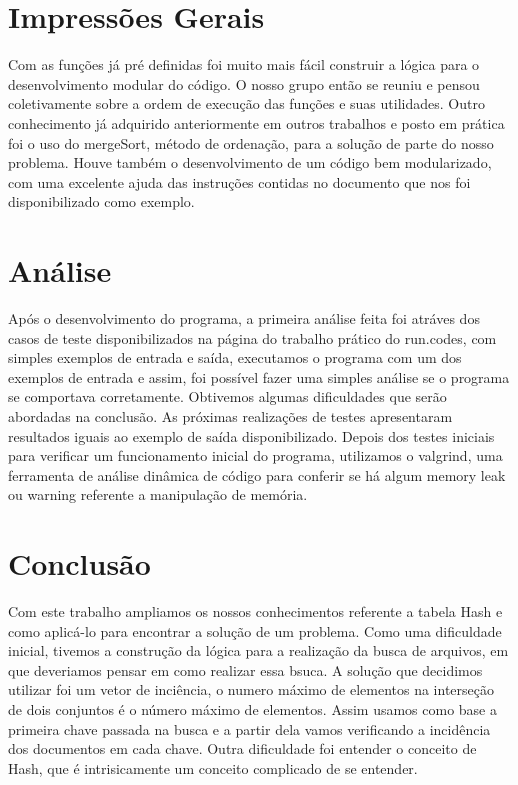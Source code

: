 \documentclass{article}
\begin{document}
\clearpage


\section{Impressões Gerais}

Com as funções já pré definidas foi muito mais fácil construir a lógica para o desenvolvimento modular do código. O nosso grupo então se reuniu e pensou coletivamente sobre a ordem de execução das funções e suas utilidades.
Outro conhecimento já adquirido anteriormente em outros trabalhos e posto em prática foi o uso do mergeSort, método de ordenação, para a solução de parte do nosso problema. Houve também o desenvolvimento de um código bem modularizado, com uma excelente ajuda das instruções contidas no documento que nos foi disponibilizado como exemplo.

\section{Análise}

Após o desenvolvimento do programa, a primeira análise feita foi atráves dos casos de teste disponibilizados na página do trabalho prático do run.codes, com simples exemplos de entrada e saída, executamos o programa com um dos exemplos de entrada e assim, foi possível fazer uma simples análise se o programa se comportava corretamente. Obtivemos algumas dificuldades que serão abordadas na conclusão. As próximas realizações de testes apresentaram resultados iguais ao exemplo de saída disponibilizado.
Depois dos testes iniciais para verificar um funcionamento inicial do programa, utilizamos o valgrind, uma ferramenta de análise dinâmica de código para conferir se há algum memory leak ou warning referente a manipulação de memória.


\section{Conclusão}

Com este trabalho ampliamos os nossos conhecimentos referente a tabela Hash e como aplicá-lo para encontrar a solução de um problema.
Como uma dificuldade inicial, tivemos a construção da lógica para a realização da busca de arquivos, em que deveriamos pensar em como realizar essa bsuca.
A solução que decidimos utilizar foi um vetor de inciência, o numero máximo de elementos na interseção de dois conjuntos é o número máximo de elementos.
Assim usamos como base a primeira chave passada na busca e a partir dela vamos verificando a incidência dos documentos em cada chave. Outra dificuldade foi entender o conceito de Hash,
que é intrisicamente um conceito complicado de se entender.
\end{document}
